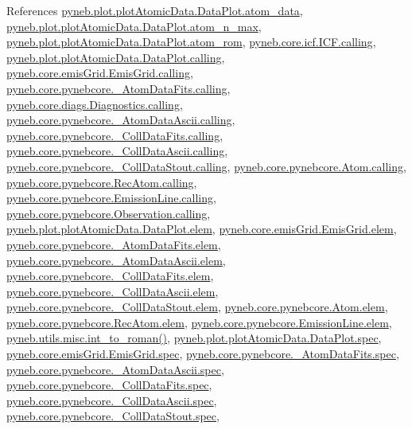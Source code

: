 References \hyperlink{plot_atomic_data_8py_source_l00071}{pyneb.\-plot.\-plot\-Atomic\-Data.\-Data\-Plot.\-atom\-\_\-data}, \hyperlink{plot_atomic_data_8py_source_l00106}{pyneb.\-plot.\-plot\-Atomic\-Data.\-Data\-Plot.\-atom\-\_\-n\-\_\-max}, \hyperlink{plot_atomic_data_8py_source_l00103}{pyneb.\-plot.\-plot\-Atomic\-Data.\-Data\-Plot.\-atom\-\_\-rom}, \hyperlink{icf_8py_source_l00016}{pyneb.\-core.\-icf.\-I\-C\-F.\-calling}, \hyperlink{plot_atomic_data_8py_source_l00042}{pyneb.\-plot.\-plot\-Atomic\-Data.\-Data\-Plot.\-calling}, \hyperlink{emis_grid_8py_source_l00044}{pyneb.\-core.\-emis\-Grid.\-Emis\-Grid.\-calling}, \hyperlink{pynebcore_8py_source_l00097}{pyneb.\-core.\-pynebcore.\-\_\-\-Atom\-Data\-Fits.\-calling}, \hyperlink{diags_8py_source_l00169}{pyneb.\-core.\-diags.\-Diagnostics.\-calling}, \hyperlink{pynebcore_8py_source_l00318}{pyneb.\-core.\-pynebcore.\-\_\-\-Atom\-Data\-Ascii.\-calling}, \hyperlink{pynebcore_8py_source_l00585}{pyneb.\-core.\-pynebcore.\-\_\-\-Coll\-Data\-Fits.\-calling}, \hyperlink{pynebcore_8py_source_l00936}{pyneb.\-core.\-pynebcore.\-\_\-\-Coll\-Data\-Ascii.\-calling}, \hyperlink{pynebcore_8py_source_l01156}{pyneb.\-core.\-pynebcore.\-\_\-\-Coll\-Data\-Stout.\-calling}, \hyperlink{pynebcore_8py_source_l01229}{pyneb.\-core.\-pynebcore.\-Atom.\-calling}, \hyperlink{pynebcore_8py_source_l02643}{pyneb.\-core.\-pynebcore.\-Rec\-Atom.\-calling}, \hyperlink{pynebcore_8py_source_l03385}{pyneb.\-core.\-pynebcore.\-Emission\-Line.\-calling}, \hyperlink{pynebcore_8py_source_l03541}{pyneb.\-core.\-pynebcore.\-Observation.\-calling}, \hyperlink{plot_atomic_data_8py_source_l00045}{pyneb.\-plot.\-plot\-Atomic\-Data.\-Data\-Plot.\-elem}, \hyperlink{emis_grid_8py_source_l00048}{pyneb.\-core.\-emis\-Grid.\-Emis\-Grid.\-elem}, \hyperlink{pynebcore_8py_source_l00090}{pyneb.\-core.\-pynebcore.\-\_\-\-Atom\-Data\-Fits.\-elem}, \hyperlink{pynebcore_8py_source_l00311}{pyneb.\-core.\-pynebcore.\-\_\-\-Atom\-Data\-Ascii.\-elem}, \hyperlink{pynebcore_8py_source_l00577}{pyneb.\-core.\-pynebcore.\-\_\-\-Coll\-Data\-Fits.\-elem}, \hyperlink{pynebcore_8py_source_l00927}{pyneb.\-core.\-pynebcore.\-\_\-\-Coll\-Data\-Ascii.\-elem}, \hyperlink{pynebcore_8py_source_l01163}{pyneb.\-core.\-pynebcore.\-\_\-\-Coll\-Data\-Stout.\-elem}, \hyperlink{pynebcore_8py_source_l01219}{pyneb.\-core.\-pynebcore.\-Atom.\-elem}, \hyperlink{pynebcore_8py_source_l02636}{pyneb.\-core.\-pynebcore.\-Rec\-Atom.\-elem}, \hyperlink{pynebcore_8py_source_l03389}{pyneb.\-core.\-pynebcore.\-Emission\-Line.\-elem}, \hyperlink{misc_8py_source_l00055}{pyneb.\-utils.\-misc.\-int\-\_\-to\-\_\-roman()}, \hyperlink{plot_atomic_data_8py_source_l00046}{pyneb.\-plot.\-plot\-Atomic\-Data.\-Data\-Plot.\-spec}, \hyperlink{emis_grid_8py_source_l00049}{pyneb.\-core.\-emis\-Grid.\-Emis\-Grid.\-spec}, \hyperlink{pynebcore_8py_source_l00091}{pyneb.\-core.\-pynebcore.\-\_\-\-Atom\-Data\-Fits.\-spec}, \hyperlink{pynebcore_8py_source_l00312}{pyneb.\-core.\-pynebcore.\-\_\-\-Atom\-Data\-Ascii.\-spec}, \hyperlink{pynebcore_8py_source_l00578}{pyneb.\-core.\-pynebcore.\-\_\-\-Coll\-Data\-Fits.\-spec}, \hyperlink{pynebcore_8py_source_l00928}{pyneb.\-core.\-pynebcore.\-\_\-\-Coll\-Data\-Ascii.\-spec}, \hyperlink{pynebcore_8py_source_l01164}{pyneb.\-core.\-pynebcore.\-\_\-\-Coll\-Data\-Stout.\-spec}, 